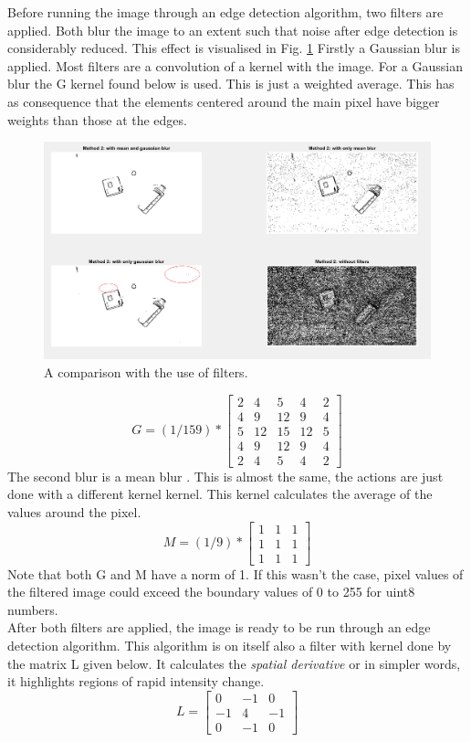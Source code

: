 \documentclass[11pt]{article}
\begin{document}
\noindent Before running the image through an edge detection algorithm, two filters are applied. Both blur the image to an extent such that noise after edge detection is considerably reduced. This effect is visualised in Fig. \ref{fig:filter_comparison}
Firstly a Gaussian blur\cite{gaussian} is applied. Most filters are a convolution of a kernel with the image. For a Gaussian blur the G kernel found below is used. This is just a weighted average. This has as consequence that the elements centered around the main pixel have bigger weights than those at the edges.
\begin{figure}[h]
	\center
  \includegraphics[width=0.7\linewidth]{filter_comparison.png}
  \caption{A comparison with the use of filters.}
  \label{fig:filter_comparison}
\end{figure}

\begin{equation}
  G = (1/159) * 
  \begin{bmatrix}
   2 & 4 & 5 & 4 & 2\\
   4 & 9 & 12 & 9 & 4\\
   5 & 12 & 15 & 12 & 5\\
   4 & 9 & 12 & 9& 4\\
   2 & 4 & 5 & 4 & 2
  \end{bmatrix}
\end{equation}
The second blur is a mean blur \cite{mean}. This is almost the same, the actions are just done with a different kernel kernel. This kernel calculates the average of the values around the pixel.
\begin{equation}
M = (1/9) * 
\begin{bmatrix}
	1&1&1\\
	1&1&1\\
	1&1&1
\end{bmatrix}
\end{equation}
Note that both G and M have a norm of 1. If this wasn't the case, pixel values of the filtered image could exceed the boundary values of 0 to 255 for uint8 numbers. \\
After both filters are applied, the image is ready to be run through an edge detection algorithm\cite{edge_detection}. This algorithm is on itself also a filter with kernel done by the matrix L given below.
It calculates the \textit{spatial  derivative} or in simpler words, it highlights regions of rapid intensity change.
\begin{equation}
L =\begin{bmatrix}
	0&-1&0\\
	-1&4&-1\\
	0&-1&0
\end{bmatrix}
\end{equation}
\end{document}
